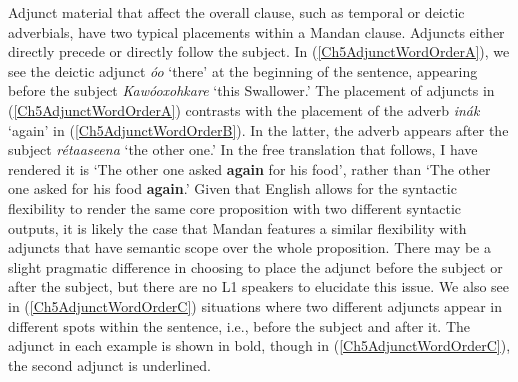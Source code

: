 Adjunct material that affect the overall clause, such as temporal or deictic adverbials, have two typical placements within a Mandan clause. Adjuncts either directly precede or directly follow the subject. In (\ref{Ch5AdjunctWordOrderA}), we see the deictic adjunct \textit{óo} `there' at the beginning of the sentence, appearing before the subject \textit{Kawóoxohkare} `this Swallower.' The placement of adjuncts in (\ref{Ch5AdjunctWordOrderA}) contrasts with the placement of the adverb \textit{inák} `again' in (\ref{Ch5AdjunctWordOrderB}). In the latter, the adverb appears after the subject \textit{rétaaseena} `the other one.' In the free translation that follows, I have rendered it is `The other one asked \textbf{again} for his food', rather than `The other one asked for his food \textbf{again}.' Given that English allows for the syntactic flexibility to render the same core proposition with two different syntactic outputs, it is likely the case that Mandan features a similar flexibility with adjuncts that have semantic scope over the whole proposition. There may be a slight pragmatic difference in choosing to place the adjunct before the subject or after the subject, but there are no L1 speakers to elucidate this issue. We also see in (\ref{Ch5AdjunctWordOrderC}) situations where two different adjuncts appear in different spots within the sentence, i.e., before the subject and after it. The adjunct in each example is shown in bold, though in (\ref{Ch5AdjunctWordOrderC}), the second adjunct is underlined.

